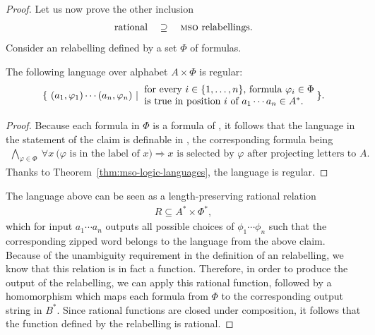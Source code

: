 \begin{proof}
Let us now prove the other inclusion
\begin{align*}
    \text{rational} \quad \supseteq \quad \text{\mso relabellings.}
    \end{align*}
    Consider an \mso relabelling defined by a set $\Phi$ of formulas. 
    
\begin{claim}\label{claim:mso-annotation-regular}
    The following language over alphabet $A \times \Phi$ is regular:
\begin{align*}
    \setbuild{ (a_1,\varphi_1) \cdots (a_n,\varphi_n)}{for every $i \in \set{1,\ldots,n}$,  formula $\varphi_i \in \Phi$ \\  is true in position $i$ of $a_1 \cdots a_n \in A^*$.}.
\end{align*}
\end{claim}

\begin{proof}
    Because each formula in $\Phi$ is a formula of \mso, it follows that the language in the statement of the claim is definable in \mso, the corresponding formula being
    \begin{align*}
    \bigwedge_{\varphi \in \Phi} \ \forall x  \ \text{($\varphi$ is in the label of $x$)} \Rightarrow \text{$x$ is selected by $\varphi$ after projecting letters to $A$}.
    \end{align*}
    Thanks to Theorem~\ref{thm:mso-logic-languages}, the language is regular.
\end{proof}

The language above can be seen as a length-preserving rational relation 
\begin{align*}
R \subseteq A^* \times \Phi^*,
\end{align*}
which for input $a_1 \cdots a_n$ outputs all possible choices of $\phi_1 \cdots \phi_n$ such that the corresponding zipped word belongs to the language from the above claim. Because of the unambiguity requirement in the definition of an \mso relabelling, we know that this relation is in fact a function. Therefore, in order to produce the output of the \mso relabelling, we can apply this rational function, followed by a homomorphism which maps each formula from $\Phi$ to the corresponding output string in $B^*$. Since rational functions are closed under composition, it follows that the function defined by the \mso relabelling is rational.
\end{proof}

